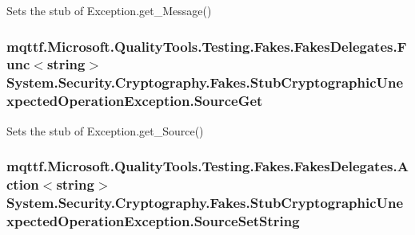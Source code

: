 Sets the stub of Exception.\-get\-\_\-\-Message()

\hypertarget{class_system_1_1_security_1_1_cryptography_1_1_fakes_1_1_stub_cryptographic_unexpected_operation_exception_a3bec944ab233b2f2dc814b958a1c6894}{
\subsubsection[{Source\-Get}]{\setlength{\rightskip}{0pt plus 5cm}mqttf.\-Microsoft.\-Quality\-Tools.\-Testing.\-Fakes.\-Fakes\-Delegates.\-Func$<$string$>$ System.\-Security.\-Cryptography.\-Fakes.\-Stub\-Cryptographic\-Unexpected\-Operation\-Exception.\-Source\-Get}}\label{class_system_1_1_security_1_1_cryptography_1_1_fakes_1_1_stub_cryptographic_unexpected_operation_exception_a3bec944ab233b2f2dc814b958a1c6894}


Sets the stub of Exception.\-get\-\_\-\-Source()

\hypertarget{class_system_1_1_security_1_1_cryptography_1_1_fakes_1_1_stub_cryptographic_unexpected_operation_exception_a6a0c506f4f382a2118519184f3fd71a3}{
\subsubsection[{Source\-Set\-String}]{\setlength{\rightskip}{0pt plus 5cm}mqttf.\-Microsoft.\-Quality\-Tools.\-Testing.\-Fakes.\-Fakes\-Delegates.\-Action$<$string$>$ System.\-Security.\-Cryptography.\-Fakes.\-Stub\-Cryptographic\-Unexpected\-Operation\-Exception.\-Source\-Set\-String}}\label{class_system_1_1_security_1_1_cryptography_1_1_fakes_1_1_stub_cryptographic_unexpected_operation_exception_a6a0c506f4f382a2118519184f3fd71a3}


